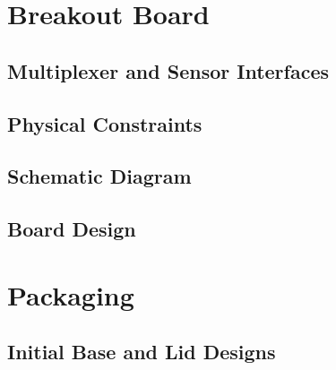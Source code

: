 \documentclass[
10pt, %
letterpaper, %
oneside, %
headinclude,footinclude, %
BCOR5mm, %
]{scrartcl}
\begin{document}

\section{Breakout Board}


\subsection{Multiplexer and Sensor Interfaces}


\subsection{Physical Constraints}


\subsection{Schematic Diagram}


\subsection{Board Design}


\section{Packaging}


\subsection{Initial Base and Lid Designs}

\end{document}
